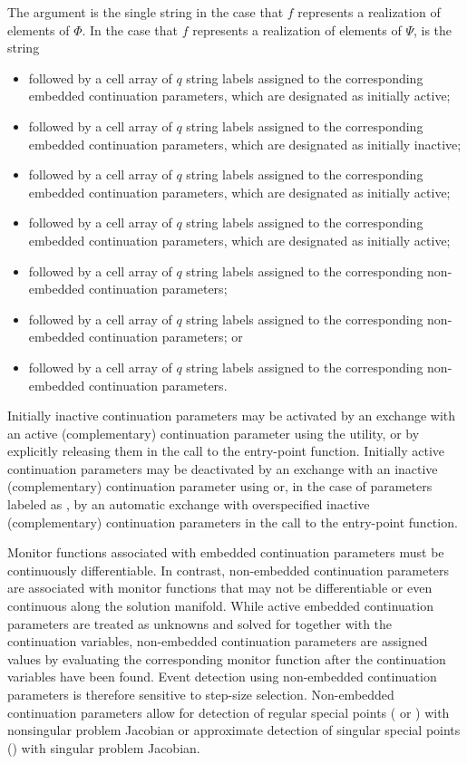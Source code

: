 The argument  is the single string  in the case that $f$ represents a realization of elements of $\Phi$. In the case that $f$ represents a realization of elements of $\Psi$,  is the string
\begin{itemize}
\item {} followed by a cell array of $q$ string labels assigned to the corresponding embedded continuation parameters, which are designated as initially active;
\item {} followed by a cell array of $q$ string labels assigned to the corresponding  embedded continuation parameters, which are designated as initially inactive;
\item {} followed by a cell array of $q$ string labels assigned to the corresponding embedded continuation parameters, which are designated as initially active;
\item {} followed by a cell array of $q$ string labels assigned to the corresponding embedded continuation parameters, which are designated as initially active;
\item {} followed by a cell array of $q$ string labels assigned to the corresponding non-embedded continuation parameters;
\item {} followed by a cell array of $q$ string labels assigned to the corresponding non-embedded continuation parameters; or
\item {} followed by a cell array of $q$ string labels assigned to the corresponding non-embedded continuation parameters.
\end{itemize}
Initially inactive continuation parameters may be activated by an exchange with an active (complementary) continuation parameter using the  utility, or by explicitly releasing them in the call to the  entry-point function. Initially active continuation parameters may be deactivated by an exchange with an inactive (complementary) continuation parameter using  or, in the case of parameters labeled as , by an automatic exchange with overspecified inactive (complementary) continuation parameters in the call to the  entry-point function. 

Monitor functions associated with embedded continuation parameters must be continuously differentiable. In contrast, non-embedded continuation parameters are associated with monitor functions that may not be differentiable or even continuous along the solution manifold. While active embedded continuation parameters are treated as unknowns and solved for together with the continuation variables, non-embedded continuation parameters are assigned values by evaluating the corresponding monitor function after the continuation variables have been found. Event detection using non-embedded continuation parameters is therefore sensitive to step-size selection. Non-embedded continuation parameters allow for detection of regular special points ( or ) with nonsingular problem Jacobian or approximate detection of singular special points () with singular problem Jacobian.

